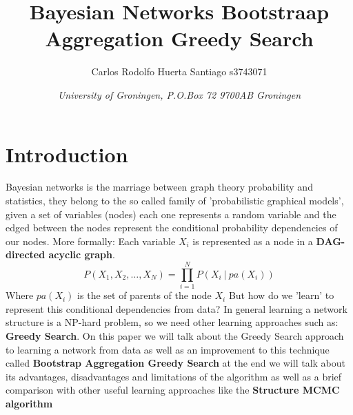 \documentclass{article}
\title{\textbf{\huge Bayesian Networks Bootstraap Aggregation Greedy Search}}
\author{Carlos Rodolfo Huerta Santiago s3743071}
\date{\textit{University of Groningen, P.O.Box 72 9700AB Groningen}}
\begin{document}
	\maketitle %
	\thispagestyle{empty}

	\section{Introduction}
	Bayesian networks is the marriage between graph theory probability and
	statistics, they belong to the so called family of 'probabilistic graphical
	models', given a set of variables (nodes) each one represents a random
	variable and the edged between the nodes represent the conditional
	probability dependencies of our nodes. More formally: Each variable $X_{i}$
	is represented as a node in a \textbf{DAG-directed acyclic graph}.
	\begin{equation}
		P(X_{1}, X_{2}, \dots ,X_{N}) = \prod_{i=1}^{N} P(X_{i} \ | \ pa(X_{i}))	
	\end{equation}
	Where $pa(X_{i})$ is the set of parents of the node $X_{i}$
	But how do we 'learn' to represent
	this conditional dependencies from data? In general learning a network
	structure is a NP-hard problem, so we need other learning approaches such as:
	\textbf{Greedy Search}. On this paper we will talk about the Greedy Search
	approach to learning a network from data as well as an improvement to this
	technique called \textbf{Bootstrap Aggregation Greedy Search} at the end we will talk
	about its advantages, disadvantages and limitations of the algorithm as well
	as a brief comparison with other useful learning approaches like the
	\textbf{Structure MCMC algorithm}
\end{document}

